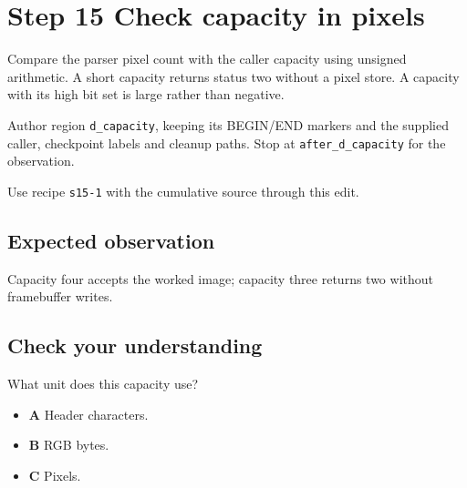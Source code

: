 \section{Step 15 Check capacity in pixels}\label{ppm-s15}

Compare the parser pixel count with the caller capacity using unsigned arithmetic. A short capacity returns status two without a pixel store. A capacity with its high bit set is large rather than negative.

Author region \texttt{d\_capacity}, keeping its BEGIN/END markers and the supplied caller, checkpoint labels and cleanup paths. Stop at \texttt{after\_d\_capacity} for the observation.

Use recipe \texttt{s15-1} with the cumulative source through this edit.

\subsection{Expected observation}
Capacity four accepts the worked image; capacity three returns two without framebuffer writes.

\subsection{Check your understanding}
What unit does this capacity use?

\begin{itemize}
  \item \textbf{A} Header characters.
  \item \textbf{B} RGB bytes.
  \item \textbf{C} Pixels.
\end{itemize}
